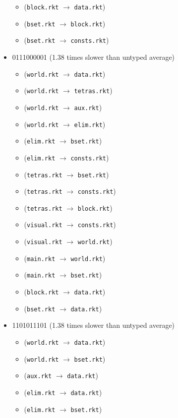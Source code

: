 \documentclass{article}
\newcommand{\mono}[1]{\texttt{#1}}
\begin{document}
\begin{itemize}
\begin{itemize}
  \item (\mono{block.rkt} $\rightarrow$ \mono{data.rkt})
  \item (\mono{bset.rkt} $\rightarrow$ \mono{block.rkt})
  \item (\mono{bset.rkt} $\rightarrow$ \mono{consts.rkt})
  \end{itemize}
\item 0111000001 (1.38 times slower than untyped average)
  \begin{itemize}
  \item (\mono{world.rkt} $\rightarrow$ \mono{data.rkt})
  \item (\mono{world.rkt} $\rightarrow$ \mono{tetras.rkt})
  \item (\mono{world.rkt} $\rightarrow$ \mono{aux.rkt})
  \item (\mono{world.rkt} $\rightarrow$ \mono{elim.rkt})
  \item (\mono{elim.rkt} $\rightarrow$ \mono{bset.rkt})
  \item (\mono{elim.rkt} $\rightarrow$ \mono{consts.rkt})
  \item (\mono{tetras.rkt} $\rightarrow$ \mono{bset.rkt})
  \item (\mono{tetras.rkt} $\rightarrow$ \mono{consts.rkt})
  \item (\mono{tetras.rkt} $\rightarrow$ \mono{block.rkt})
  \item (\mono{visual.rkt} $\rightarrow$ \mono{consts.rkt})
  \item (\mono{visual.rkt} $\rightarrow$ \mono{world.rkt})
  \item (\mono{main.rkt} $\rightarrow$ \mono{world.rkt})
  \item (\mono{main.rkt} $\rightarrow$ \mono{bset.rkt})
  \item (\mono{block.rkt} $\rightarrow$ \mono{data.rkt})
  \item (\mono{bset.rkt} $\rightarrow$ \mono{data.rkt})
  \end{itemize}
\item 1101011101 (1.38 times slower than untyped average)
  \begin{itemize}
  \item (\mono{world.rkt} $\rightarrow$ \mono{data.rkt})
  \item (\mono{world.rkt} $\rightarrow$ \mono{bset.rkt})
  \item (\mono{aux.rkt} $\rightarrow$ \mono{data.rkt})
  \item (\mono{elim.rkt} $\rightarrow$ \mono{data.rkt})
  \item (\mono{elim.rkt} $\rightarrow$ \mono{bset.rkt})

\end{itemize}
\end{itemize}
\end{document}
